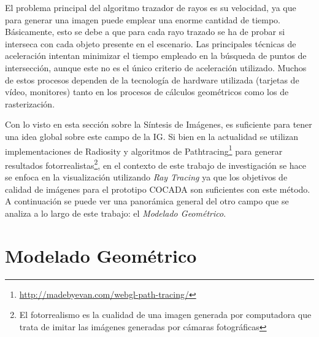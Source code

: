 

El problema principal del algoritmo trazador de rayos es su velocidad, ya que para generar una imagen puede emplear una enorme cantidad de tiempo. Básicamente, esto se debe a que para cada rayo trazado se ha de probar si interseca con cada objeto presente en el escenario. Las principales técnicas de aceleración intentan minimizar el tiempo empleado en la búsqueda de puntos de intersección, aunque este no es el único criterio de aceleración utilizado. Muchos de estos procesos dependen de la tecnología de hardware utilizada (tarjetas de vídeo, monitores) tanto en los procesos de cálculos geométricos como los de rasterización.


Con lo visto en esta sección sobre la Síntesis de Imágenes, es suficiente para tener una idea global sobre este campo de la IG. Si bien en la actualidad se utilizan implementaciones de Radiosity y algoritmos de Pathtracing\footnote{\url{http://madebyevan.com/webgl-path-tracing/}} para generar resultados fotorrealistas\footnote{El fotorrealismo es la cualidad de una imagen generada por computadora que trata de imitar las imágenes generadas por cámaras fotográficas}, en el contexto de este trabajo de investigación se hace se enfoca en la visualización utilizando \textit{Ray Tracing} ya que los objetivos de calidad de imágenes para el prototipo COCADA son suficientes con este método. A continuación se puede ver una panorámica general del otro campo que se analiza a lo largo de este trabajo: el \textit{Modelado Geométrico}.


\clearpage
\section{Modelado Geométrico}

